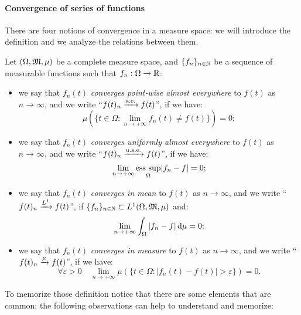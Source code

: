 \paragraph{Convergence of series of functions} There are four notions of convergence in a measure space: we will introduce the definition and we analyze the relations between them.
\begin{defn}
	Let $(\Omega, \mathfrak M, \mu)$ be a complete measure space, and $\{f_n\}_{n\in \mathbb N}$ be a sequence of measurable functions such that $f_n : \Omega \to \mathbb R$:
	\begin{itemize}
		\item we say that $f_n(t)$ \emph{converges point-wise almost everywhere} to $f(t)$ as $n\to \infty$,
			and we write ``$f(t)_n \xrightarrow{\text{a.e.}} f(t)$'',
			if we have:
			$$
				\mu (\{t \in \Omega: \lim\limits_{n \to +\infty} f_n(t) \neq f(t)\})
				= 0
			;
			$$
			
		\item we say that $f_n(t)$ \emph{converges uniformly almost everywhere} to $f(t)$ as $n\to \infty$,
			and we write ``$f(t)_n \xrightarrow{\text{u.a.e.}} f(t)$'',
			if we have:
			$$
				\lim\limits_{n \to +\infty}\underset{\Omega}{\operatorname*{ess\ sup}} |f_n-f| 
				= 0
			;
			$$
			
		\item we say that $f_n(t)$ \emph{converges in mean} to $f(t)$ as $n\to \infty$,
			and we write ``$f(t)_n \xrightarrow{L^{1}} f(t)$'',
			if $\{f_n\}_{n \in\mathbb N} \subset L^1(\Omega, \mathfrak M, \mu)$ and: 
			$$
				\lim\limits_{n \to +\infty} \int_\Omega |f_n-f| \,\mathrm d \mu 
				= 0
			;
			$$
			
		\item we say that $f_n(t)$ \emph{converges in measure} to $f(t)$ as $n\to \infty$,
			and we write ``$f(t)_n \xrightarrow{\mu} f(t)$'',
			if we have:
			$$
				\forall \varepsilon >0 
				\quad \lim\limits_{n \to +\infty} \mu(\{t\in \Omega : |f_n (t)-f(t)| > \varepsilon \}) 
				= 0
			.
			$$
	\end{itemize}
\end{defn}
To memorize those definition notice that there are some elements that are common; the following observations can help to understand and memorize:
